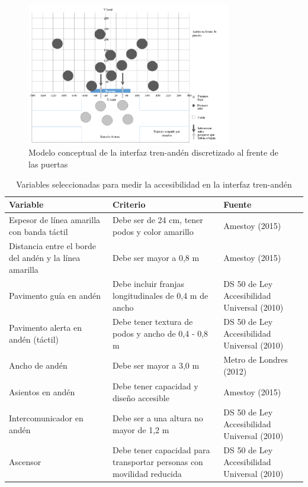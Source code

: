 \begin{figure}[h]
  \centering
  \includegraphics[width=0.8\textwidth]{imagenes/ilustracion_2.png}
  \caption{Modelo conceptual de la interfaz tren-andén discretizado al frente de las puertas}\label{fig2}
\end{figure}


\begin{table}[ht]
  \begin{tabularx}{\linewidth}{|X |X |X|}
  \hline
    Variable & 
    Criterio &
    Fuente \\ 
  \hline
    Espesor de línea amarilla con banda táctil&
    Debe ser de 24 cm, tener podos y color amarillo &
    Amestoy (2015)\\
  \hline
    Distancia entre el borde del andén y la línea amarilla &
    Debe ser mayor a 0,8 m &
    Amestoy (2015)\\
  \hline
    Pavimento guía en andén &
    Debe incluir franjas longitudinales de 0,4 m de ancho &
    DS 50 de Ley Accesibilidad Universal (2010) \\
   \hline
    Pavimento alerta en andén (táctil) &
    Debe tener textura de podos y ancho de 0,4 - 0,8 m &
    DS 50 de Ley Accesibilidad Universal (2010) \\
  \hline
    Ancho de andén &
    Debe ser mayor a 3,0 m &
    Metro de Londres (2012) \\
    \hline
    
    Asientos en andén &
    Debe tener capacidad y diseño accesible &
    Amestoy (2015) \\
    \hline
    
    Intercomunicador en andén &
    Debe ser a una altura no mayor de 1,2 m &
    DS 50 de Ley Accesibilidad Universal (2010) \\
    \hline

    Ascensor &
    Debe tener capacidad para transportar personas con movilidad reducida &
    DS 50 de Ley Accesibilidad Universal (2010) \\
    \hline
  \end{tabularx}
  \caption{Variables seleccionadas para medir la accesibilidad en la interfaz tren-andén}
  \label{tabla1}
\end{table}


